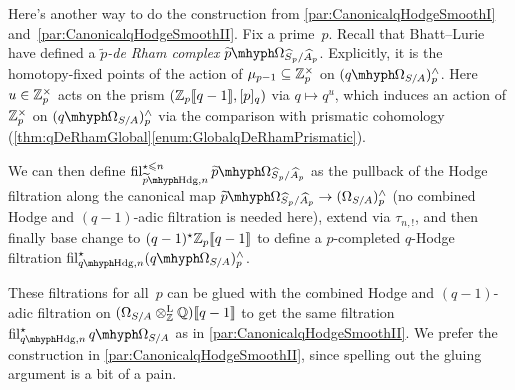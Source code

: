 \documentclass[DIV=12,numbers=enddot,leqno,bibliography=totoc]{scrartcl}
\newcommand{\pOmega}{\mathop{\widetilde{p}}\!\hspace{-0.1ex}\mhyph\hspace{-0.1ex}\Omega}
\newcommand{\pHodge}{\mathop{\widetilde{p}}\!\hspace{-0.1ex}\mhyph\hspace{-0.1ex}\Hodge}
\begin{document}
	\begin{rem}\label{rem:pTildeDeRham}
		Here's another way to do the construction from \cref{par:CanonicalqHodgeSmoothI} and~\cref{par:CanonicalqHodgeSmoothII}. Fix a prime~$p$. Recall that Bhatt--Lurie \cite[Construction~]{BhattLurieI} have defined a \emph{$\widetilde{p}$-de Rham complex} $\pOmega_{\smash{\widehat{S}}_p/\smash{\widehat{A}}_p}$. Explicitly, it is the homotopy-fixed points of the action of $\mu_{p-1}\subseteq \mathbb{Z}_p^\times$ on $(\qOmega_{S/A})_p^\complete$. Here $u\in\mathbb{Z}_p^\times$ acts on the prism $(\mathbb{Z}_p\llbracket q-1\rrbracket,[p]_q)$ via $q\mapsto q^u$, which induces an action of $\mathbb{Z}_p^\times$ on $(\qOmega_{S/A})_p^\complete$ via the comparison with prismatic cohomology (\cref{thm:qDeRhamGlobal}\cref{enum:GlobalqDeRhamPrismatic}).
		
		We can then define $\fil_{\pHodge,n}^{\star\leqslant n}\pOmega_{\smash{\widehat{S}}_p/\smash{\widehat{A}}_p}$ as the pullback of the Hodge filtration along the canonical map $\pOmega_{\smash{\widehat{S}}_p/\smash{\widehat{A}}_p}\rightarrow (\Omega_{S/A})_p^\complete$ (no combined Hodge and $(q-1)$-adic filtration is needed here), extend via $\tau_{n,!}$, and then finally base change to $(q-1)^\star\mathbb{Z}_p\llbracket q-1\rrbracket$ to define a $p$-completed $q$-Hodge filtration $\fil_{\qHodge,n}^\star(\qOmega_{S/A})_p^\complete$.
		
		These filtrations for all~$p$ can be glued with the combined Hodge and $(q-1)$-adic filtration on $(\Omega_{S/A}\otimes^{\mathrm{L}}_{\mathbb{Z}}\mathbb{Q})\llbracket q-1\rrbracket$ to get the same filtration $\fil_{\qHodge,n}^\star\qOmega_{S/A}$ as in \cref{par:CanonicalqHodgeSmoothII}. We prefer the construction in \cref{par:CanonicalqHodgeSmoothII}, since spelling out the gluing argument is a bit of a pain.
	\end{rem}
	
	
\end{document}

